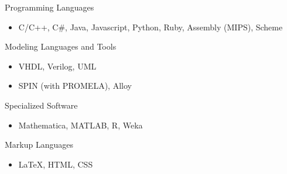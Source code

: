 \documentclass[letterpaper,11pt]{article}
\newcommand{\resitem}[1]{\item #1 \vspace{-2pt}}
\begin{document}
\begin{compactitem}

\item
	Programming Languages
	\begin{itemize} 
		\resitem{C/C++, C\#, Java, Javascript, Python, Ruby, Assembly (MIPS), Scheme}
	\end{itemize}

\item
	Modeling Languages and Tools
	\begin{itemize}
		\resitem{VHDL, Verilog, UML}
		\resitem{SPIN (with PROMELA), Alloy}
	\end{itemize}

\item
	Specialized Software
	\begin{itemize}
		\resitem{Mathematica, MATLAB, R, Weka}
	\end{itemize}

\item
	Markup Languages
	\begin{itemize}
		\resitem{\LaTeX, HTML, CSS}
	\end{itemize}
\end{compactitem}
\end{document}
